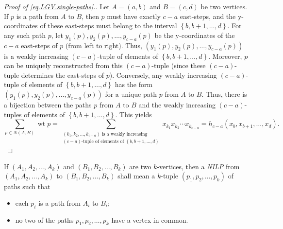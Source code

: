 \documentclass[reqno]{amsart}%
\newcommand{\0}{\phantom{c}}
\let\sumnonlimits\sum
\renewcommand{\sum}{\sumnonlimits\limits}
\newcommand{\defn}[1]{{\color{darkred}\emph{#1}}}
\theoremstyle{plain}
\theoremstyle{definition}
\numberwithin{equation}{section}
\begin{document}
\begin{proof}
[Proof of \eqref{eq.LGV.single-paths}.]Let $A=\left(  a,b\right)  $ and
$B=\left(  c,d\right)  $ be two vertices. If $p$ is a path from $A$ to $B$,
then $p$ must have exactly $c-a$ east-steps, and the y-coordinates of these
east-steps must belong to the interval $\left\{  b,b+1,\ldots,d\right\}  $.
For any such path $p$, let $y_{1}\left(  p\right)  ,y_{2}\left(  p\right)
,\ldots,y_{c-a}\left(  p\right)  $ be the y-coordinates of the $c-a$
east-steps of $p$ (from left to right). Thus, $\left(  y_{1}\left(  p\right)
,y_{2}\left(  p\right)  ,\ldots,y_{c-a}\left(  p\right)  \right)  $ is a
weakly increasing $\left(  c-a\right)  $-tuple of elements of $\left\{
b,b+1,\ldots,d\right\}  $. Moreover, $p$ can be uniquely reconstructed from
this $\left(  c-a\right)  $-tuple (since these $\left(  c-a\right)  $-tuple
determines the east-steps of $p$). Conversely, any weakly increasing $\left(
c-a\right)  $-tuple of elements of $\left\{  b,b+1,\ldots,d\right\}  $ has the
form $\left(  y_{1}\left(  p\right)  ,y_{2}\left(  p\right)  ,\ldots
,y_{c-a}\left(  p\right)  \right)  $ for a unique path $p$ from $A$ to $B$.
Thus, there is a bijection between the paths $p$ from $A$ to $B$ and the
weakly increasing $\left(  c-a\right)  $-tuples of elements of $\left\{
b,b+1,\ldots,d\right\}  $. This yields
\[
\sum_{p\in N\left(  A,B\right)  }\operatorname*{wt}p=\sum_{\substack{\left(
k_{1},k_{2},\ldots,k_{c-a}\right)  \text{ is a weakly increasing}\\\left(
c-a\right)  \text{-tuple of elements of }\left\{  b,b+1,\ldots,d\right\}
}}x_{k_{1}}x_{k_{2}}\cdots x_{k_{c-a}}=h_{c-a}\left(  x_{b},x_{b+1}%
,\ldots,x_{d}\right)  .
\]

\end{proof}

If $\left(  A_{1},A_{2},\ldots,A_{k}\right)  $ and $\left(  B_{1},B_{2}%
,\ldots,B_{k}\right)  $ are two $k$-vertices, then a \defn{NILP} from $\left(
A_{1},A_{2},\ldots,A_{k}\right)  $ to $\left(  B_{1},B_{2},\ldots
,B_{k}\right)  $ shall mean a $k$-tuple $\left(  p_{1},p_{2},\ldots
,p_{k}\right)  $ of paths such that

\begin{itemize}
\item each $p_{i}$ is a path from $A_{i}$ to $B_{i}$;

\item no two of the paths $p_{1},p_{2},\ldots,p_{k}$ have a vertex in common.
\end{itemize}
\end{document}
